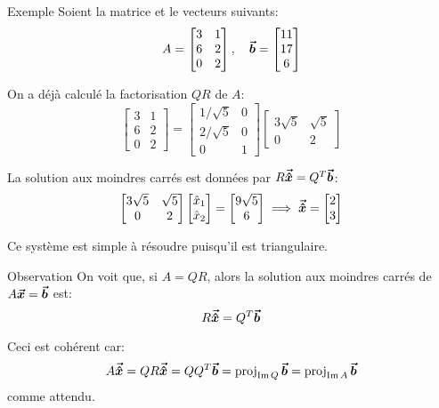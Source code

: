 \documentclass[a4paper]{article}
\begin{document}
\begin{parag}{Exemple}
    Soient la matrice et le vecteurs suivants:
    \[A = \begin{bmatrix} 3 & 1 \\ 6 & 2 \\ 0 & 2 \end{bmatrix}, \quad \bm{\protect\vec{b}} = \begin{bmatrix} 11 \\ 17 \\ 6 \end{bmatrix} \]

    On a déjà calculé la factorisation $QR$ de $A$:
    \[\begin{bmatrix} 3 & 1 \\ 6 & 2 \\ 0 & 2 \end{bmatrix} = \begin{bmatrix} 1 / \sqrt{5} & 0 \\ 2 / \sqrt{5} & 0 \\ 0 & 1 \end{bmatrix} \begin{bmatrix} 3\sqrt{5} & \sqrt{5} \\ 0 & 2 \end{bmatrix} \]

    La solution aux moindres carrés est données par $R \bm{\protect\vec{\hat{x}}} = Q^T \bm{\protect\vec{b}}$:
    \[\begin{bmatrix} 3\sqrt{5} & \sqrt{5} \\ 0 & 2 \end{bmatrix} \begin{bmatrix} \hat{x}_1 \\ \hat{x}_2 \end{bmatrix} = \begin{bmatrix} 9\sqrt{5} \\ 6 \end{bmatrix} \implies \bm{\protect\vec{\hat{x}}} = \begin{bmatrix} 2 \\ 3 \end{bmatrix} \]

    Ce système est simple à résoudre puisqu'il est triangulaire.
\end{parag}

\begin{parag}{Observation}
    On voit que, si $A = QR$, alors la solution aux moindres carrés de $A \bm{\protect\vec{x}} = \bm{\protect\vec{b}}$ est:
    \[R \bm{\protect\vec{\hat{x}}} = Q^T \bm{\protect\vec{b}}\]

    Ceci est cohérent car:
    \[A \bm{\protect\vec{\hat{x}}} = QR \bm{\protect\vec{\hat{x}}} = QQ^T \bm{\protect\vec{b}} = \operatorname{proj}_{\operatorname{Im} Q} \bm{\protect\vec{b}} = \operatorname{proj}_{\operatorname{Im} A} \bm{\protect\vec{b}}\]
    comme attendu.
\end{parag}
\end{document}
